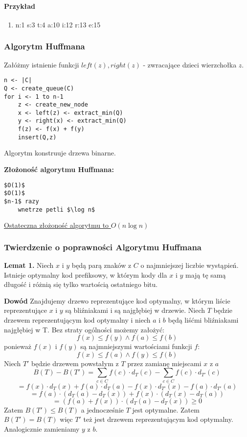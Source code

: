 \paragraph{Przykład}
\begin{enumerate}
\item n:1 s:3 t:4 a:10 i:12 r:13 e:15
\end{enumerate}

\subsubsection{Algorytm Huffmana}
Załóżmy istnienie funkcji $left(z), right(z)$ - zwracające dzieci wierzchołka $z$.
\begin{lstlisting}[caption={Huffman(C,F)}]
n <- |C|
Q <- create_queue(C)
for i <- 1 to n-1
	z <- create_new_node
	x <- left(z) <- extract_min(Q)
	y <- right(x) <- extract_min(Q)
	f(z) <- f(x) + f(y)
	insert(Q,z)
\end{lstlisting}

Algorytm konstruuje drzewa binarne.

\textbf{Złożoność algorytmu Huffmana:}
\begin{lstlisting}
$O(1)$
$O(1)$
$n-1$ razy
	wnetrze petli $\log n$
\end{lstlisting}
\underline{Ostateczna złożoność algorytmu to $O(n \log n)$}

\subsubsection{Twierdzenie o poprawności Algorytmu Huffmana}
\textbf{Lemat 1.} Niech $x$ i $y$ będą parą znaków z $C$ o najmniejszej liczbie wystąpień. Istnieje optymalny kod prefiksowy, w którym kody dla $x$ i $y$ mają tę samą długość i różnią się tylko wartością ostatniego bitu.

\textbf{Dowód} Znajdujemy drzewo reprezentujące kod optymalny, w którym liście reprezentujące $x$ i $y$ są bliźniakami i są najgłębiej w drzewie. Niech $T$ będzie drzewem reprezentującym kod optymalny i niech $a$ i $b$ będą liśćmi bliźniakami najgłębiej w T. 
Bez straty ogólności możemy założyć:
$$ f(x) \leq f(y) \land f(a) \leq f(b) $$
ponieważ $f(x)$ i $f(y)$ są najmniejszymi wartościami funkcji $f$:
$$ f(x) \leq f(a) \land f(y) \leq f(b) $$
Niech $T'$ będzie drzewem powstałym z $T$ przez zamianę miejscami $x$ z $a$
$$ B(T) - B(T') = \sum_{c \in C} f(c) \cdot d_T(c) - \sum_{c \in C} f(c) \cdot d_{T'}(c) $$
$$ = f(x) \cdot d_T(x) + f(a) \cdot d_T(a) - f(x) \cdot d_{T'}(x) - f(a) \cdot d_{T'}(a) $$
$$ = f(a) \cdot (d_T(a) - d_T(x)) + f(x) \cdot (d_T(x) - d_T(a)) $$ 
$$ = (f(a) + f(x)) \cdot (d_T(a) - d_T(x)) \geq 0$$
Zatem $B(T') \leq B(T)$ a jednocześnie $T$ jest optymalne. Zatem $B(T') = B(T)$ więc $T'$ też jest drzewem reprezentującym kod optymalny. Analogicznie zamieniamy $y$ z $b$.

